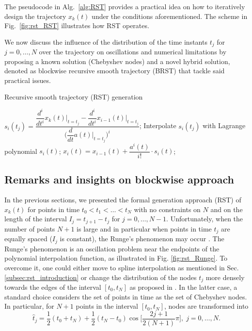 The pseudocode in Alg.~\ref{alg:RST} provides a practical idea on how to iteratively design the trajectory $x_k(t)$ under the conditions aforementioned. The scheme in Fig.~\ref{fig:rst_RST} illustrates how RST operates.



We now discuss the influence of the distribution of the time instants $t_j$ for $j=0,\dots,N$ over the trajectory on oscillations and numerical limitations by proposing a known solution (Chebyshev nodes) and a novel hybrid solution, denoted as blockwise recursive smooth trajectory (BRST) that tackle said practical issues.

\begin{algorithm}
\caption{Recursive smooth trajectory (RST) generation}
\label{alg:RST}
\begin{algorithmic}[1]
		\State $s_i(t_j)=\dfrac{\dfrac{d^i}{dt^i}x_k(t)\biggr|_{t=t_j} -\dfrac{d^i}{dt^i}x_{i-1}(t)\biggr|_{t=t_j}}{\displaystyle \Biggl(\dfrac{d}{dt}a(t)\biggr|_{t=t_j}\Biggr)^i}$;
	\EndFor
	\State Interpolate $s_i(t_j)$ with Lagrange polynomial $s_i(t)$;
	\State $x_i(t) = x_{i-1}(t)+\dfrac{a^i(t)}{i!}\cdot s_i(t)$;
\EndFor
\end{algorithmic}
\end{algorithm}

\subsection{Remarks and insights on blockwise approach}
In the previous sections, we presented the formal generation approach (RST) of $x_k(t)$ for points in time $t_0<t_1< \dots <t_N$ with no constraints on $N$ and on the length of the interval $I_j = t_{j+1}-t_j$ for $j = 0,\dots, N-1$. 
Unfortunately, when the number of points $N+1$ is large and in particular when points in time $t_j$ are equally spaced ($I_j$ is constant), the Runge's phenomenon may occur \cite{Runge}. The Runge's phenomenon is an oscillation problem near the endpoints of the polynomial interpolation function, as illustrated in Fig. \ref{fig:rst_Runge}. To overcome it, one could either move to spline interpolation as mentioned in Sec. \ref{subsec:rst_introduction} or change the distribution of the nodes $t_j$ more densely towards the edges of the interval $[t_0, t_N]$ as proposed in \cite{Berrut}.
In the latter case, a standard choice considers the set of points in time as the set of Chebyshev nodes. In particular, for $N+1$ points in the interval $[t_0, t_N]$, nodes are transformed into
\begin{equation}
\hat{t}_j = \frac{1}{2}(t_0+t_N) + \frac{1}{2}(t_N-t_0)\cos\biggl[\dfrac{2j+1}{2(N+1)}\pi\biggr], \; j = 0,\dots, N.
\label{Cheby}
\end{equation}

